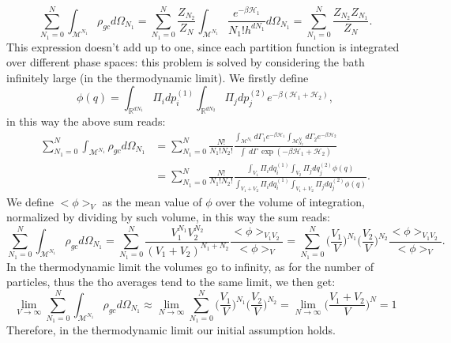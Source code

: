 \begin{equation*}
    \sum_{N_1=0}^{N}\int_{\mathcal{M}^{N_1}}\rho_{gc}d\Omega_{N_1}=\sum_{N_1=0}^{N}\frac{Z_{N_2}}{Z_{N}}\int_{\mathcal{M}^{N_1}}\frac{e^{-\beta\mathcal{H}_1}}{N_1!h^{dN_1}}d\Omega_{N_1}=\sum_{N_1=0}^{N}\frac{Z_{N_2}Z_{N_1}}{Z_{N}}.
\end{equation*}
This expression doesn't add up to one, since each partition function is integrated over different phase spaces: this problem is solved by considering the bath infinitely large (in the thermodynamic limit). We firstly define
\begin{equation*}
    \phi(q)=\int_{\mathbb{R} ^{dN_1}}\Pi_i dp_i^{(1)}\int_{\mathbb{R} ^{dN_2}}\Pi_j dp_j^{(2)}e^{-\beta(\mathcal{H}_1+\mathcal{H} _2)},
\end{equation*}  
in this way the above sum reads:
\begin{align*}
    \sum_{N_1=0}^{N}\int_{\mathcal{M}^{N_1}}\rho_{gc}d\Omega_{N_1}&=\sum_{N_1=0}^{N} \frac{N!}{N_1!N_2!}\frac{\int_{\mathcal{M}^{N_1}}d\Gamma_1 e^{-\beta\mathcal{H}_1}\int_{\mathcal{M}^N_{N_2}}d\Gamma_2 e^{-\beta\mathcal{H}_2}}{\int\ d\Gamma\ \exp(-\beta{\mathcal{H}_1+\mathcal{H}_2})} 
    \\&=\sum_{N_1=0}^{N} \frac{N!}{N_1!N_2!}\frac{\int_{V_1}\Pi_i dq_i^{(1)}\int_{V_2}\Pi_j dq_j^{(2)}\phi(q)}{\int_{V_1+V_2}\Pi_i dq_i^{(1)}\int_{V_1+V_2}\Pi_j dq_j^{(2)}\phi(q)}.
\end{align*}
We define $\big<\phi\big>_{V}$ as the mean value of $\phi$ over the volume of integration, normalized by dividing by such volume, in this way the sum reads:
\begin{equation*}
    \sum_{N_1=0}^{N}\int_{\mathcal{M}^{N_1}}\rho_{gc}d\Omega_{N_1}=\sum_{N_1=0}^{N}\frac{V_1^{N_1}V_2^{N_2}}{(V_1+V_2)^{N_1+N_2}}\frac{\big<\phi\big>_{V_1V_2}}{\big<\phi\big>_{V}}=\sum_{N_1=0}^{N}\bigg(\frac{V_1}{V}\bigg)^{N_1}\bigg(\frac{V_2}{V}\bigg)^{N_2}\frac{\big<\phi\big>_{V_1V_2}}{\big<\phi\big>_{V}}.
\end{equation*}
In the thermodynamic limit the volumes go to infinity, as for the number of particles, thus the tho averages tend to the same limit, we then get:
\begin{equation*}
    \lim_{V\rightarrow\infty} \sum_{N_1=0}^{N}\int_{\mathcal{M}^{N_1}}\rho_{gc}d\Omega_{N_1}\approx\lim_{N\rightarrow\infty}\sum_{N_1=0}^{N}\bigg(\frac{V_1}{V}\bigg)^{N_1}\bigg(\frac{V_2}{V}\bigg)^{N_2}=\lim_{N\rightarrow\infty}\bigg(\frac{V_1+V_2}{V}\bigg)^N=1
\end{equation*}
Therefore, in the thermodynamic limit our initial assumption holds.\\

